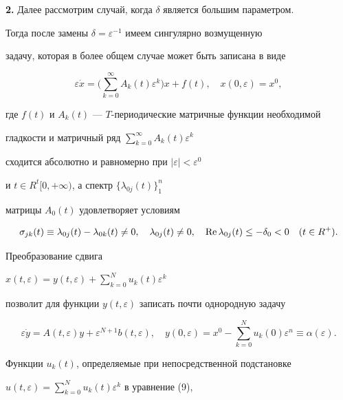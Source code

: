 {\bf 2.} Далее рассмотрим случай, когда $\delta$ является большим параметром. 


Тогда после замены $\delta=\varepsilon^{-1}$ имеем сингулярно возмущенную 


задачу, которая в более общем случае может быть записана в виде


\begin{equation}


\varepsilon\Dot{x}=\bigg(\sum^\infty_{k=0} A_k(t)\varepsilon^k\bigg)x+f(t),


\quad x(0,\varepsilon)=x^0,


\end{equation}


где $f(t)$ и $A_k(t)$ --- $T$-периодические матричные функции необходимой 


гладкости и матричный ряд $\sum\limits^\infty_{k=0}A_k(t)\varepsilon^k$


сходится абсолютно и равномерно при $|\varepsilon |< \varepsilon^0$


и $t \in R^t [0,+\infty )$, а спектр $\{\lambda_{0j}(t)\}_1^n$


матрицы $A_0(t)$ удовлетворяет условиям


\begin{equation}


\sigma_{jk}(t)\equiv \lambda_{0j}(t)-\lambda_{0k}(t)\neq 0,


\quad \lambda_{0j}(t)\neq0,\quad \re\lambda_{0j}(t)\leq -\delta_0< 0


\quad (t\in R^+).


\end{equation}


Преобразование сдвига 


$x(t,\varepsilon)=y(t,\varepsilon)+\sum\limits^N_{k=0}u_k(t)\varepsilon^k$ 


позволит для функции $y(t,\varepsilon)$ записать почти однородную задачу


$$


\varepsilon\Dot{y}=A(t,\varepsilon)y+\varepsilon^{N+1} b(t,\varepsilon),


\quad y(0,\varepsilon)=x^0-\sum^N_{k=0}u_k(0)\varepsilon^n\equiv


\alpha(\varepsilon).


$$


Функции $u_k(t)$, определяемые при непосредственной подстановке 


$u(t,\varepsilon)=\sum\limits^N_{k=0}u_k(t)\varepsilon^k$ в уравнение (9), 


